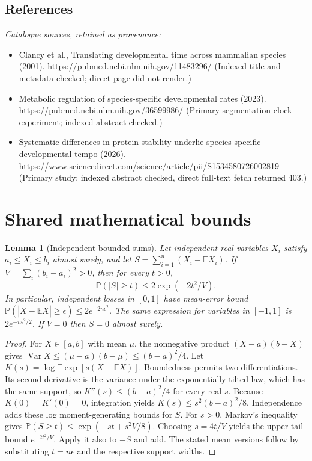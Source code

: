 \documentclass[11pt]{article}
\newcommand{\E}{\mathbb E}
\newcommand{\Prob}{\mathbb P}
\DeclareMathOperator{\Var}{Var}
\providecommand{\E}{\mathbb E}
\providecommand{\Prob}{\mathbb P}
\providecommand{\Var}{\operatorname{Var}}
\newtheorem{sharedlemma}{Lemma}[section]
\begin{document}
\subsection{References}
\noindent\emph{Catalogue sources, retained as provenance:}
\begin{itemize}
\item Clancy et al., Translating developmental time across mammalian species (2001). \url{https://pubmed.ncbi.nlm.nih.gov/11483296/} (Indexed title and metadata checked; direct page did not render.)
\item Metabolic regulation of species-specific developmental rates (2023). \url{https://pubmed.ncbi.nlm.nih.gov/36599986/} (Primary segmentation-clock experiment; indexed abstract checked.)
\item Systematic differences in protein stability underlie species-specific developmental tempo (2026). \url{https://www.sciencedirect.com/science/article/pii/S1534580726002819} (Primary study; indexed abstract checked, direct full-text fetch returned 403.)
\end{itemize}
\clearpage


\appendix
\section{Shared mathematical bounds}\label{app:bounds}
\begin{sharedlemma}[Independent bounded sums]\label{lem:bounded}
Let independent real variables $X_i$ satisfy $a_i\leq X_i\leq b_i$ almost surely,
and let $S=\sum_{i=1}^n(X_i-\E X_i)$. If
$V=\sum_i(b_i-a_i)^2>0$, then for every $t>0$,
\[
 \Prob(|S|\geq t)\leq 2\exp(-2t^2/V).
\]
In particular, independent losses in $[0,1]$ have mean-error bound
$\Prob(|\overline X-\E\overline X|\geq\epsilon)
\leq2e^{-2n\epsilon^2}$. The same expression for variables in $[-1,1]$
is $2e^{-n\epsilon^2/2}$. If $V=0$ then $S=0$ almost surely.
\end{sharedlemma}
\begin{proof}
For $X\in[a,b]$ with mean $\mu$, the nonnegative product
$(X-a)(b-X)$ gives
$\Var X\leq(\mu-a)(b-\mu)\leq(b-a)^2/4$.
Let $K(s)=\log\E\exp[s(X-\E X)]$.
Boundedness permits two differentiations. Its second derivative is the variance
under the exponentially tilted law, which has the same support, so
$K''(s)\leq(b-a)^2/4$ for every real $s$.
Because $K(0)=K'(0)=0$, integration yields
$K(s)\leq s^2(b-a)^2/8$.
Independence adds these log moment-generating bounds for $S$.
For $s>0$, Markov's inequality gives
$\Prob(S\geq t)\leq\exp(-st+s^2V/8)$.
Choosing $s=4t/V$ yields the upper-tail bound $e^{-2t^2/V}$.
Apply it also to $-S$ and add. The stated mean versions follow by substituting
$t=n\epsilon$ and the respective support widths.
\end{proof}
\end{document}
